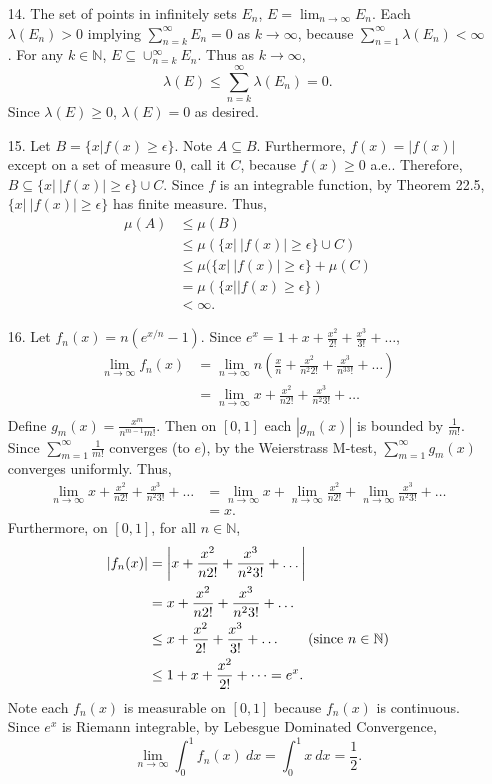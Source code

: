 \documentclass[a4paper, 12pt]{article}
\def\N{\ensuremath{\mathbb{N}}}
\newcommand{\abs}[1]{\left\vert#1\right\vert} %
\newcommand{\eq}[1]{\begin{align*}#1\end{align*}} %
\renewcommand{\eq}[1]{\begin{align*}#1\end{align*}} %
\begin{document}
\begin{enumerate}
    \item[14.]
    The set of points in infinitely sets $E_n$, 
    $E = \lim_{n \rightarrow \infty} E_n.$
    Each $\lambda(E_n) > 0$ implying $\sum_{n=k}^\infty E_n = 0$ 
    as $k \rightarrow \infty$, because $\sum_{n=1}^\infty \lambda(E_n) < \infty$.
    For any $k \in \N$, $E \subseteq \cup_{n=k}^\infty E_n$. 
    Thus as $k \rightarrow \infty$, 
    $$\lambda(E) \leq \sum_{n=k}^\infty \lambda(E_n) = 0.$$
    Since $\lambda(E) \geq 0$, $\lambda(E) = 0$ as desired.

    \item[15.]
    Let $B = \{x | f(x) \geq \epsilon\}$. Note $A \subseteq B$.
    Furthermore, $f(x) = |f(x)|$ except on a set of measure 0, call it $C$, because 
    $f(x) \geq 0$ a.e..
    Therefore, $B \subseteq \{x |\ |f(x)| \geq \epsilon\} \cup C$.
    Since $f$ is an integrable function, 
    by Theorem 22.5, 
    $\{x |\ |f(x)| \geq \epsilon\}$ has finite 
    measure.
    Thus, 
    \eq{ \mu(A) &\leq \mu(B) \\
    & \leq \mu( \{x |\ |f(x)| \geq \epsilon\} \cup C) \\
    & \leq \mu( \{x |\ |f(x)| \geq \epsilon\} + \mu(C) \\
    & = \mu(\{x | |f(x) \geq \epsilon\}) \\
    & < \infty.
    }

    \item[16.]
    Let $f_n(x) = n (e^{x/n} - 1).$
    Since $e^x = 1 + x + \frac{x^2}{2!} + \frac{x^3}{3!} + \dots$, 
    \eq{\lim_{n \rightarrow \infty} f_n(x) 
        & = \lim_{n \rightarrow \infty} n ( \frac{x}{n} + \frac{x^2}{n^2 2!} 
        + \frac{x^3}{n^33!} + \dots) \\
        & = \lim_{n \rightarrow \infty} x + \frac{x^2}{n 2!} + \frac{x^3}{n^2 3!} + \dots \\
    }
    Define $g_m(x) = \frac{x^m}{n^{m-1} m!}$. Then on $[0, 1]$ each $|g_m(x)|$ is bounded 
    by $\frac{1}{m!}$. Since $\sum_{m=1}^\infty \frac{1}{m!}$ converges (to $e$), 
    by the Weierstrass M-test, $\sum_{m=1}^\infty g_m(x)$ converges uniformly.
    Thus, 
    \eq{\lim_{n \rightarrow \infty} x + \frac{x^2}{n 2!} + \frac{x^3}{n^2 3!} + \dots 
    &= \lim_{n \rightarrow \infty} x + \lim_{n \rightarrow \infty}\frac{x^2}{n 2!} + \lim_{n \rightarrow \infty} \frac{x^3}{n^2 3!} + \dots \\
    & = x.
    }
    Furthermore, on $[0, 1]$, for all $n \in \N$, 
    \eq{|f_n(x)| &= \abs{x + \frac{x^2}{n 2!} + \frac{x^3}{n^2 3!} + \dots}\\
    & = x + \frac{x^2}{n 2!} + \frac{x^3}{n^2 3!} + \dots \\
    & \leq x + \frac{x^2}{2!} + \frac{x^3}{3!} + \dots 
    \tag{since $n \in \N$}\\
    & \leq 1 + x + \frac{x^2}{2!} + \dots = e^x.
    }
    Note each $f_n(x)$ is measurable on $[0, 1]$ because $f_n(x)$ is continuous.
    Since $e^x$ is Riemann integrable, by Lebesgue Dominated Convergence, 
    $$\lim_{n \rightarrow \infty} \int_0^1 f_n(x)\ dx = \int_0^1 x\ dx = \frac{1}{2}.$$
    

\end{enumerate}
\end{document}
